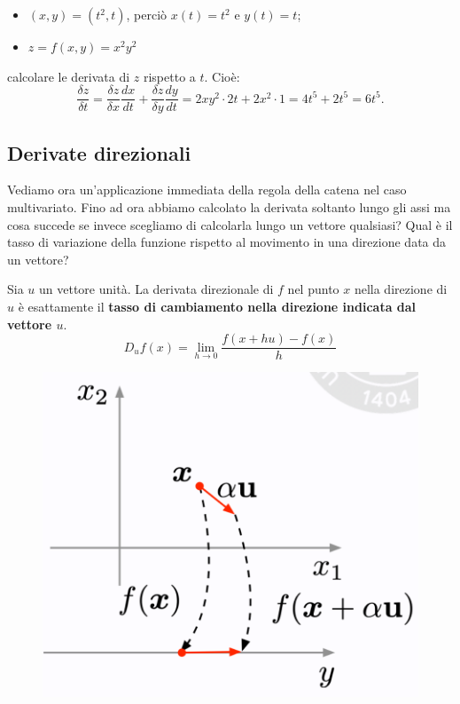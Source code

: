 \begin{itemize}
    \item $(x,y)=(t^2,t)$, perciò $x(t)=t^2$ e $y(t)=t$;
    \item $z=f(x,y)=x^2y^2$
\end{itemize}
calcolare le derivata di $z$ rispetto a $t$. 
Cioè:
\begin{equation}
    \frac{\delta z}{\delta t}=\frac{\delta z}{\delta x}\frac{dx}{dt}+\frac{\delta z}{\delta y}\frac{dy}{dt}=2xy^2\cdot 2t+2x^2\cdot1=4t^5+2t^5=6t^5.
\end{equation}

\subsection{Derivate direzionali}
Vediamo ora un'applicazione immediata della regola della catena nel caso multivariato. Fino ad ora abbiamo calcolato la derivata soltanto lungo gli assi ma cosa succede se invece scegliamo di calcolarla lungo un vettore qualsiasi? Qual è il tasso di variazione della funzione rispetto al movimento in una direzione data da un vettore?


Sia $u$ un vettore unità. La derivata direzionale di $f$ nel punto $x$ nella direzione di $u$ è esattamente il \textbf{tasso di cambiamento nella direzione indicata dal vettore $u$}.
\begin{equation}
    D_uf(x)=\lim_{h\rightarrow 0}\frac{f(x+hu)-f(x)}{h}
\end{equation}
\begin{figure}[!h]
    \includegraphics[scale=0.5]{images/prerequisites/dirDerivatives.png}
    \centering
\end{figure}



